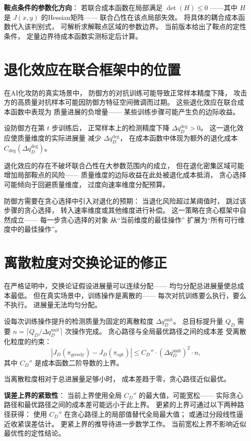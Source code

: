 \documentclass[11pt,a4paper]{article}
\begin{document}
\textbf{鞍点条件的参数化方向}：
若联合成本函数在局部满足 \(\det(H) \le 0\)
——其中 \(H\) 是 \(J(x, y)\) 的Hessian矩阵——
联合凸性在该点局部失效。
将具体的耦合成本函数代入该判别式，
可解析求解鞍点区域的参数边界。
当前版本给出了鞍点的定性条件，
定量边界待成本函数实测标定后计算。

\section{退化效应在联合框架中的位置}

在AI化攻防的真实场景中，
防御方的对抗训练可能导致正常样本精度下降，
攻击方的高质量对抗样本可能因防御方特征空间微调而过期。
这些退化效应在联合成本函数中表现为
质量进展的负增量——
某些训练步骤可能产生负的边际收益。

设防御方在第 \(t\) 步训练后，
正常样本上的检测精度下降 \(\Delta q_D^{\text{deg}} > 0\)。
这一退化效应使质量维度的实际进展量
减少 \(\Delta q_D^{\text{deg}}\)，
在成本函数中体现为额外的退化成本 \(C_{\text{deg}}(\Delta q_D^{\text{deg}})\)。

退化效应的存在不破坏联合凸性在大参数范围内的成立，
但在退化密集区域可能增加局部鞍点的风险——
质量维度的边际收益在此处被退化成本抵消，
贪心选择可能倾向于回避质量维度，
过度向速率维度分配预算。

防御方需要在贪心选择中引入对退化的预期：
当退化风险超过某阈值时，
跳过该步骤的贪心选择，
转入速率维度或其他维度进行补偿。
这一策略在贪心框架中自然成立——
每一步贪心选择的对象
从“当前维度的最佳操作”
扩展为“所有可行维度中的最佳操作”。

\section{离散粒度对交换论证的修正}

在严格证明中，交换论证假设进展量可以连续分配——
均匀分配总进展量使总成本最低。
但在真实场景中，训练操作是离散的——
每次对抗训练要么执行，要么不执行。
进展量无法均匀分配。

设每次训练操作提升的检测质量为固定的离散粒度 \(\Delta q_D^{\text{unit}}\)。
总目标提升量 \(Q_D\) 需要 \(n = \lceil Q_D / \Delta q_D^{\text{unit}} \rceil\) 次操作完成。
贪心路径与全局最优路径之间的成本差
受离散化粒度的约束：
\[
|J_D(\pi_{\text{greedy}}) - J_D(\pi_{\text{opt}})| \le
C_D'' \cdot (\Delta q_D^{\text{unit}})^2 \cdot n,
\]
其中 \(C_D''\) 是成本函数二阶导数的上界。

当离散粒度相对于总进展量足够小时，
成本差趋于零，贪心路径近似最优。

\textbf{误差上界的紧致性}：
当前上界使用全局 \(C_D''\) 的最大值，可能宽松——
实际贪心路径和最优路径之间的成本差可能远小于此上界。
更紧的上界可通过以下两种路径获得：
使用 \(C_D''\) 在贪心路径上的局部值替代全局最大值；
或通过分段线性逼近收紧误差估计。
更紧上界的推导待进一步数学工作。
当前宽松上界不影响近似最优性的定性结论。
\end{document}
